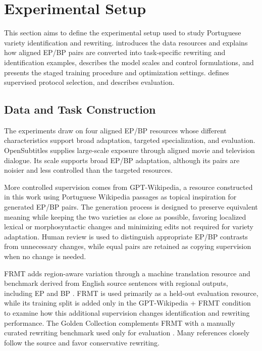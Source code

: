 \documentclass[acmtog,nonacm]{acmart}
\begin{document}
\section{Experimental Setup}
\label{sec:methods}

This section aims to define the experimental setup used to study Portuguese
variety identification and rewriting.  introduces the data resources and explains
how aligned EP/BP pairs are converted into task-specific rewriting and
identification examples,  describes the
model scales and control formulations, and 
presents the staged training procedure and optimization settings.  defines supervised protocol selection, and
 describes evaluation.

\subsection{Data and Task Construction}
\label{sec:data-task-construction}

The experiments draw on four aligned EP/BP resources whose different
characteristics support broad adaptation, targeted specialization, and
evaluation. OpenSubtitles \citep{4992de1b5fb34f3e9691772606b36edf}
supplies large-scale exposure through aligned movie and television dialogue.
Its scale supports broad EP/BP adaptation, although its pairs are noisier and less controlled than the targeted resources.

More controlled supervision comes from GPT-Wikipedia, a resource constructed in this work using Portuguese Wikipedia passages as topical inspiration for generated EP/BP pairs. The generation process is designed to preserve equivalent meaning while keeping the two varieties as close as possible, favoring localized lexical or morphosyntactic changes and minimizing edits not required for variety adaptation. Human review is used to distinguish appropriate EP/BP contrasts from unnecessary changes, while equal pairs are retained as copying supervision when no change is needed.

FRMT adds region-aware variation through a machine translation resource and benchmark derived from English source sentences with regional outputs,
including EP and BP \citep{riley-etal-2023-frmt}. FRMT is used primarily as a
held-out evaluation resource, while its training split is added only in the
GPT-Wikipedia + FRMT condition to examine how this additional supervision
changes identification and rewriting performance. The Golden Collection
complements FRMT with a manually curated rewriting benchmark used only for
evaluation \citep{sanches2024brazilianportugueseeuropeanportuguese}. Many references closely follow the source and favor conservative rewriting.
\end{document}
